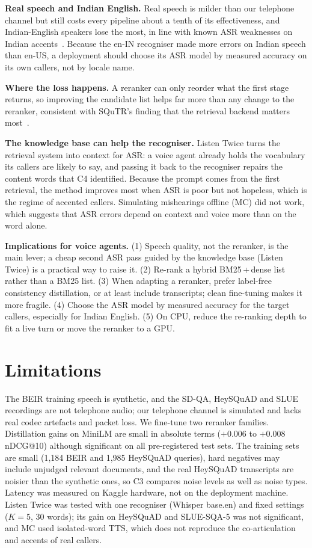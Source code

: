 \documentclass[conference]{IEEEtran}
\begin{document}
\textbf{Real speech and Indian English.} Real speech is milder than our telephone channel but still costs every pipeline about a tenth of its effectiveness, and Indian-English speakers lose the most, in line with known ASR weaknesses on Indian accents~\cite{svarah}. Because the en-IN recogniser made more errors on Indian speech than en-US, a deployment should choose its ASR model by measured accuracy on its own callers, not by locale name.

\textbf{Where the loss happens.} A reranker can only reorder what the first stage returns, so improving the candidate list helps far more than any change to the reranker, consistent with SQuTR's finding that the retrieval backend matters most~\cite{squtr}.

\textbf{The knowledge base can help the recogniser.} Listen Twice turns the retrieval system into context for ASR: a voice agent already holds the vocabulary its callers are likely to say, and passing it back to the recogniser repairs the content words that C4 identified. Because the prompt comes from the first retrieval, the method improves most when ASR is poor but not hopeless, which is the regime of accented callers. Simulating mishearings offline (MC) did not work, which suggests that ASR errors depend on context and voice more than on the word alone.

\textbf{Implications for voice agents.} (1) Speech quality, not the reranker, is the main lever; a cheap second ASR pass guided by the knowledge base (Listen Twice) is a practical way to raise it. (2) Re-rank a hybrid BM25\,+\,dense list rather than a BM25 list. (3) When adapting a reranker, prefer label-free consistency distillation, or at least include transcripts; clean fine-tuning makes it more fragile. (4) Choose the ASR model by measured accuracy for the target callers, especially for Indian English. (5) On CPU, reduce the re-ranking depth to fit a live turn or move the reranker to a GPU.

\section{Limitations}
The BEIR training speech is synthetic, and the SD-QA, HeySQuAD and SLUE recordings are not telephone audio; our telephone channel is simulated and lacks real codec artefacts and packet loss. We fine-tune two reranker families. Distillation gains on MiniLM are small in absolute terms ($+0.006$ to $+0.008$ nDCG@10) although significant on all pre-registered test sets. The training sets are small (1,184 BEIR and 1,985 HeySQuAD queries), hard negatives may include unjudged relevant documents, and the real HeySQuAD transcripts are noisier than the synthetic ones, so C3 compares noise levels as well as noise types. Latency was measured on Kaggle hardware, not on the deployment machine. Listen Twice was tested with one recogniser (Whisper base.en) and fixed settings ($K=5$, 30 words); its gain on HeySQuAD and SLUE-SQA-5 was not significant, and MC used isolated-word TTS, which does not reproduce the co-articulation and accents of real callers.
\end{document}
